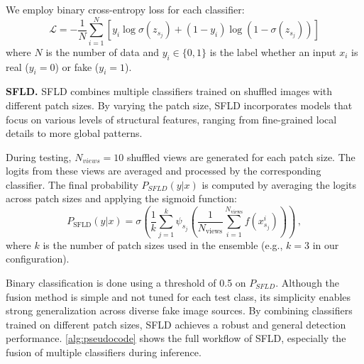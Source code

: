 We employ binary cross-entropy loss for each classifier:
\small\begin{equation}
    \mathcal{L} = -\frac{1}{N} \sum_{i=1}^{N} \left[ y_i \log \sigma(z_{s_j}) + (1 - y_i) \log \left(1 - \sigma(z_{s_j}) \right) \right] 
\end{equation}\normalsize
where $N$ is the number of data and $y_i \in \{0, 1\}$ is the label whether an input $x_i$ is real ($y_i = 0$) or fake ($y_i = 1$).

\textbf{SFLD.} SFLD combines multiple classifiers trained on shuffled images with different patch sizes.
By varying the patch size, SFLD incorporates models that focus on various levels of structural features, ranging from fine-grained local details to more global patterns.

During testing, $N_{views}=10$ shuffled views are generated for each patch size. The logits from these views are averaged and processed by the corresponding classifier. The final probability $P_{SFLD}(y|x)$ is computed by averaging the logits across patch sizes and applying the sigmoid function:
\small\begin{equation}
    P_{\text{SFLD}}(y|x) = \sigma\left(\frac{1}{k} \sum_{j=1}^{k} \psi_{s_j}\left(\frac{1}{N_{\text{views}}} \sum_{i=1}^{N_{\text{views}}} f(x_{s_j}^i)\right)\right) \,,
\end{equation}\normalsize
where $k$ is the number of patch sizes used in the ensemble (e.g., $k=3$ in our configuration).

Binary classification is done using a threshold of 0.5 on $P_{SFLD}$. Although the fusion method is simple and not tuned for each test class, its simplicity enables strong generalization across diverse fake image sources. By combining classifiers trained on different patch sizes, SFLD achieves a robust and general detection performance. \cref{alg:pseudocode} shows the full workflow of SFLD, especially the fusion of multiple classifiers during inference.

